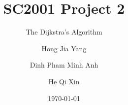 \documentclass{beamer}
\title{SC2001 Project 2}
\subtitle{The Dijkstra's Algorithm}
\author[Hong, Dingh, He]{Hong Jia Yang \and Dinh Pham Minh Anh \and He Qi Xin}
\institute{Team 4}
\date{\today}
\begin{document}
\begin{frame}
	\titlepage
\end{frame}

\begin{frame}
	
\end{frame}
\end{document}
